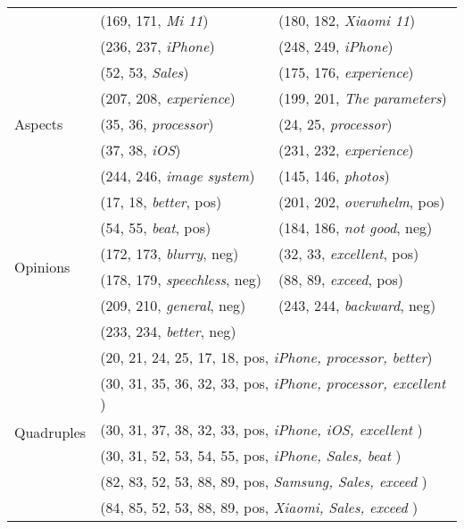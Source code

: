 \documentclass[11pt]{article}
\begin{document}
\begin{table*}[!ht]
\begin{tabular}{l l p{7cm} p{6cm}}
    & \multicolumn{2}{p{6cm}}{ (169, 171, \textit{Mi 11})} & (180, 182, \textit{Xiaomi 11}) \\
    & \multicolumn{2}{p{6cm}}{ (236, 237, \textit{iPhone})} & (248, 249, \textit{iPhone}) \\
  \hline
    \multirow{5}{*}{Aspects} & \multicolumn{2}{p{6cm}}{ (52, 53, \textit{Sales})} & (175, 176, \textit{experience}) \\
    & \multicolumn{2}{p{6cm}}{ (207, 208, \textit{experience})} & (199, 201, \textit{The parameters}) \\
    & \multicolumn{2}{p{6cm}}{ (35, 36, \textit{processor})} & (24, 25, \textit{processor}) \\
    & \multicolumn{2}{p{6cm}}{ (37, 38, \textit{iOS})} & (231, 232, \textit{experience}) \\
    & \multicolumn{2}{p{6cm}}{ (244, 246, \textit{image system})} & (145, 146, \textit{photos}) \\
  \hline
    \multirow{6}{*}{Opinions} & \multicolumn{2}{p{6cm}}{ (17, 18, \textit{better}, pos)} & (201, 202, \textit{ overwhelm}, pos) \\
    & \multicolumn{2}{p{6cm}}{ (54, 55, \textit{beat}, pos)} & (184, 186, \textit{not good}, neg) \\
    & \multicolumn{2}{p{6cm}}{ (172, 173, \textit{blurry}, neg)} & (32, 33, \textit{excellent}, pos) \\
    & \multicolumn{2}{p{6cm}}{ (178, 179, \textit{speechless}, neg)} & (88, 89, \textit{exceed}, pos) \\
    & \multicolumn{2}{p{6cm}}{ (209, 210, \textit{general}, neg)} & (243, 244, \textit{backward}, neg) \\
    & \multicolumn{2}{p{6cm}}{ (233, 234, \textit{better}, neg)} \\
  \hline
    \multirow{11}{*}{Quadruples} & \multicolumn{3}{l}{ (20, 21, 24, 25, 17, 18, pos, \textit{iPhone, processor, better})} \\
   &  \multicolumn{3}{l}{(30, 31, 35, 36, 32, 33, pos, \textit{iPhone, processor, excellent })} \\
   &  \multicolumn{3}{l}{(30, 31, 37, 38, 32, 33, pos, \textit{iPhone, iOS, excellent })} \\
   &  \multicolumn{3}{l}{(30, 31, 52, 53, 54, 55, pos, \textit{iPhone, Sales, beat })} \\
   &  \multicolumn{3}{l}{(82, 83, 52, 53, 88, 89, pos, \textit{Samsung, Sales, exceed })} \\
   &  \multicolumn{3}{l}{(84, 85, 52, 53, 88, 89, pos, \textit{Xiaomi, Sales, exceed })} \\

\end{tabular}
\end{table*}
\end{document}
